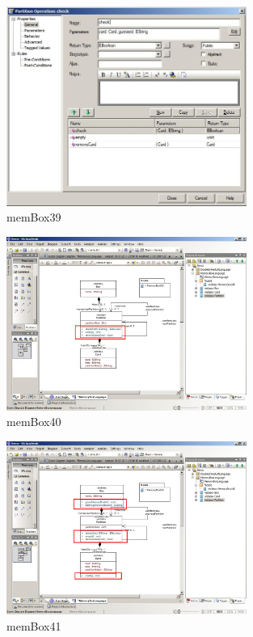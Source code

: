 \begin{figure}[!h]
	\centering
  \includegraphics[width=0.7\textwidth]{pics/memBox39.png}
	\caption{memBox39}
	\label{memBox39}
\end{figure}

\begin{figure}[!h]
	\centering
  \includegraphics[width=0.7\textwidth]{pics/memBox40.png}
	\caption{memBox40}
	\label{memBox40}
\end{figure}

\begin{figure}[!h]
	\centering
  \includegraphics[width=0.7\textwidth]{pics/memBox41.png}
	\caption{memBox41}
	\label{memBox41}
\end{figure}

